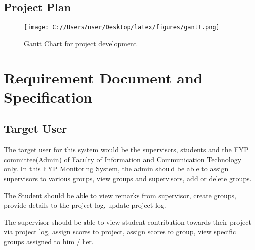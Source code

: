 \documentclass{article}
\begin{document}
\subsection{Project Plan}
 \begin{figure}[h!]
  \texttt{[image: C://Users/user/Desktop/latex/figures/gantt.png]}
  \caption{Gantt Chart for project development}
  \label{fig:gantt}
\end{figure}
\section{Requirement Document and Specification}
\subsection{Target User}
\par The target user for this system would be the supervisors, students and the FYP committee(Admin)  of
Faculty of Information and Communication Technology only. In this FYP Monitoring System, the admin should be able to assign supervisors to various groups, view groups and supervisors, add or delete groups. \par The Student should be able to view remarks from supervisor, create groups, provide details to the project log, update project log. \par The supervisor should be able to view student contribution towards their project via project log, assign scores to project, assign scores to group, view specific groups assigned to him / her.
\end{document}
